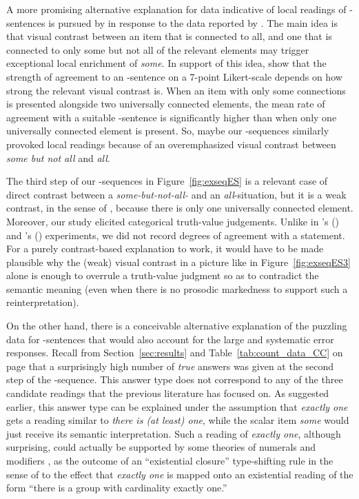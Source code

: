 \documentclass[fleqn,reqno,10pt]{article}
\renewcommand{\es}{\acro{es}}
\begin{document}
A more promising alternative explanation for data indicative of local
readings of \es-sentences is pursued by
\citet{GeurtsTielvan-Tiel2013:Embedded-Scalar} in response to the data
reported by \citet{ChemlaSpector2010:Experimental-Ev}. The main idea
is that visual contrast between an item that is connected to all, and
one that is connected to only some but not all of the relevant
elements may trigger exceptional local enrichment of \emph{some}. In
support of this idea,
\citeauthor{GeurtsTielvan-Tiel2013:Embedded-Scalar} show that the
strength of agreement to an \es-sentence on a 7-point Likert-scale
depends on how strong the relevant visual contrast is. When an item
with only some connections is presented alongside two universally
connected elements, the mean rate of agreement with a suitable
\es-sentence is significantly higher than when only one universally
connected element is present. So, maybe our \es-sequences similarly
provoked local readings because of an overemphasized visual contrast
between \emph{some but not all} and \emph{all}.

The third step of our \es-sequences in Figure~\ref{fig:exseqES} is a
relevant case of direct contrast between a \emph{some-but-not-all-}
and an \emph{all}-situation, but it is a weak contrast, in the sense
of \citet{GeurtsTielvan-Tiel2013:Embedded-Scalar}, because there is
only one universally connected element. Moreover, our study elicited
categorical truth-value judgements. Unlike in
\citeauthor{ChemlaSpector2010:Experimental-Ev}'s
(\citeyear{ChemlaSpector2010:Experimental-Ev}) and
\citeauthor{GeurtsTielvan-Tiel2013:Embedded-Scalar}'s
(\citeyear{GeurtsTielvan-Tiel2013:Embedded-Scalar}) experiments, we
did not record degrees of agreement with a statement. For a purely
contrast-based explanation to work, it would have to be made plausible
why the (weak) visual contrast in a picture like in
Figure~\ref{fig:exseqES3} alone is enough to overrule a truth-value
judgment so as to contradict the semantic meaning (even when there is
no prosodic markedness to support such a reinterpretation).

On the other hand, there is a conceivable alternative explanation of
the puzzling data for \es-sentences that would also account for the
large and systematic error responses. Recall from
Section~\ref{sec:results} and Table~\ref{tab:count_data_CC} on page
\pageref{tab:count_data_CC} that a surprisingly high number of
\emph{true} answers was given at the second step of the
\es-sequence. This answer type does not correspond to any of the three
candidate readings that the previous literature has focused on. As
suggested earlier, this answer type can be explained under the
assumption that \emph{exactly one} gets a reading similar to
\emph{there is (at least) one}, while the scalar item \emph{some}
would just receive its semantic interpretation. Such a reading of
\emph{exactly one}, although surprising, could actually be supported
by some theories of numerals and modifiers
\citep[e.g.][]{Geurts2006:Take-five,MartyChemla2014:Phantom-reading},
as the outcome of an ``existential closure'' type-shifting rule in the
sense of \citet{Partee1987:Noun-phrase-int} to the effect that
\emph{exactly one} is mapped onto an existential reading of the form
``there is a group with cardinality exactly one.''
\end{document}
